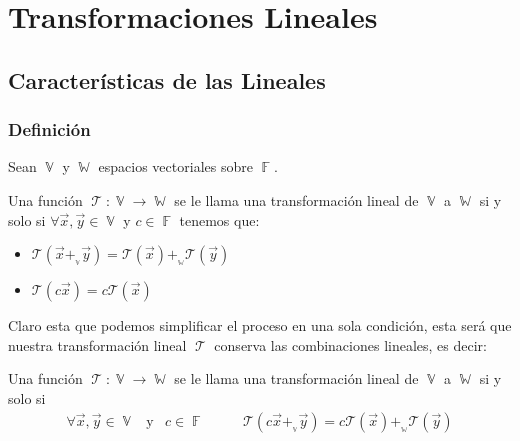 \documentclass[12pt, fleqn]{report}                             %
\DeclareMathOperator \Space     {\quad}                         %
\DeclareMathOperator \MegaSpace {\quad \quad}                   %
\DeclareMathOperator \MiniSpace {\;}                            %
\newcommand \Also           {\MiniSpace \text{y} \MiniSpace}    %
\theoremstyle{break}                                            %
\DeclareMathOperator \GenericField {\mathbb{F}}                 %
\DeclareMathOperator \VectorSet    {\mathbb{V}}                 %
\DeclareMathOperator \SubVectorSet {\mathbb{W}}                 %
\DeclareMathOperator \LinTrans      {\mathcal{T}}               %
\newcommand{\Wrap}[1]           {\left( #1 \right)}             %
\newcommand{\FnLinTrans}[1]{\mathcal{T}\Wrap{#1}}               %
\begin{document}
\part{Transformaciones Lineales}
\clearpage



    \chapter{Características de las Lineales}


        \clearpage
        \section{Definición}


            Sean $\VectorSet$ y $\SubVectorSet$ espacios vectoriales sobre $\GenericField$.

            Una función $\LinTrans: \VectorSet \to \SubVectorSet$ se le llama una transformación lineal
            de $\VectorSet$ a $\SubVectorSet$ si y solo si 
            $\forall \vec x, \vec y \in \VectorSet$ y $c \in \GenericField$ tenemos que:
            \begin{itemize}
                \item 
                    $\FnLinTrans{\vec x +_{{}_{\VectorSet}} \vec y} 
                        = \FnLinTrans{\vec x} +_{{}_{\SubVectorSet}} \FnLinTrans{\vec y}$
                \item $\FnLinTrans{c\vec x} = c\FnLinTrans{\vec x}$
            \end{itemize}

            Claro esta que podemos simplificar el proceso en una sola condición, esta será que nuestra
            transformación lineal $\LinTrans$ conserva las combinaciones lineales, es decir:

            Una función $\LinTrans: \VectorSet \to \SubVectorSet$ se le llama una transformación lineal
            de $\VectorSet$ a $\SubVectorSet$ si y solo si 
            \begin{align*}
                \forall \vec x, \vec y \in \VectorSet 
                    \Also c \in \GenericField
                \MegaSpace
                \FnLinTrans{c \vec x +_{{}_{\VectorSet}} \vec y} 
                        = c\FnLinTrans{\vec x} +_{{}_{\SubVectorSet}} \FnLinTrans{\vec y}
            \end{align*}
\end{document}
